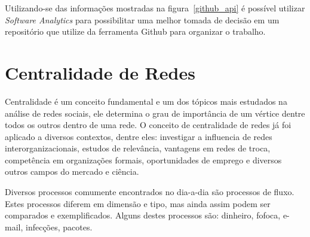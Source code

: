 Utilizando-se das informações mostradas na figura~\ref{github_api} é possível utilizar
\textit{Software Analytics} para possibilitar uma melhor tomada de decisão em um
repositório que utilize da ferramenta Github para organizar o trabalho.

\section{Centralidade de Redes}

Centralidade é um conceito fundamental e um dos tópicos mais estudados na análise 
de redes sociais, ele determina o grau de importância de um vértice dentre todos
os outros dentro de uma rede. O conceito de centralidade de redes já foi aplicado a diversos contextos,
dentre eles: investigar a influencia de redes interorganizacionais, estudos de relevância,
vantagens em redes de troca, competência em organizações formais, oportunidades de emprego 
e diversos outros campos do mercado e ciência\cite{centrality}.

Diversos processos comumente encontrados no dia-a-dia são processos de fluxo. Estes
processos diferem em dimensão e tipo, mas ainda assim podem ser comparados e exemplificados.
Alguns destes processos são: dinheiro, fofoca, e-mail, infecções, pacotes.  

